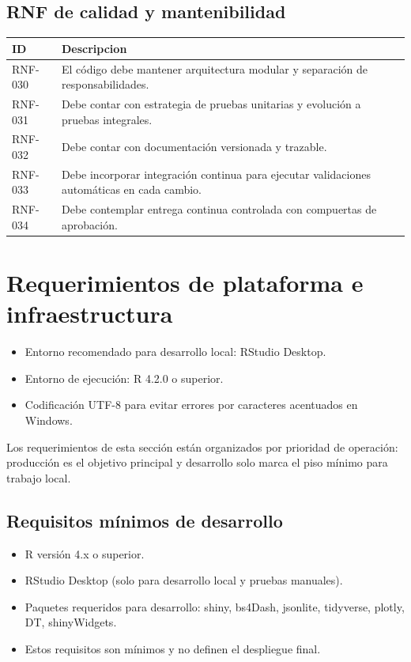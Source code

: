 \subsection{RNF de calidad y mantenibilidad}
\begin{longtable}{p{} p{}}
\toprule
\textbf{ID} & \textbf{Descripcion} \\
\midrule
RNF-030 & El código debe mantener arquitectura modular y separación de responsabilidades. \\
RNF-031 & Debe contar con estrategia de pruebas unitarias y evolución a pruebas integrales. \\
RNF-032 & Debe contar con documentación versionada y trazable. \\
RNF-033 & Debe incorporar integración continua para ejecutar validaciones automáticas en cada cambio. \\
RNF-034 & Debe contemplar entrega continua controlada con compuertas de aprobación. \\
\bottomrule
\end{longtable}

\section{Requerimientos de plataforma e infraestructura}
\begin{itemize}
  \item Entorno recomendado para desarrollo local: RStudio Desktop.
  \item Entorno de ejecución: R 4.2.0 o superior.
  \item Codificación UTF-8 para evitar errores por caracteres acentuados en Windows.
\end{itemize}
Los requerimientos de esta sección están organizados por prioridad de operación: producción es el objetivo principal y desarrollo solo marca el piso mínimo para trabajo local.

\subsection{Requisitos mínimos de desarrollo}
\begin{itemize}
  \item R versión 4.x o superior.
  \item RStudio Desktop (solo para desarrollo local y pruebas manuales).
  \item Paquetes requeridos para desarrollo: shiny, bs4Dash, jsonlite, tidyverse, plotly, DT, shinyWidgets.
  \item Estos requisitos son mínimos y no definen el despliegue final.
\end{itemize}

